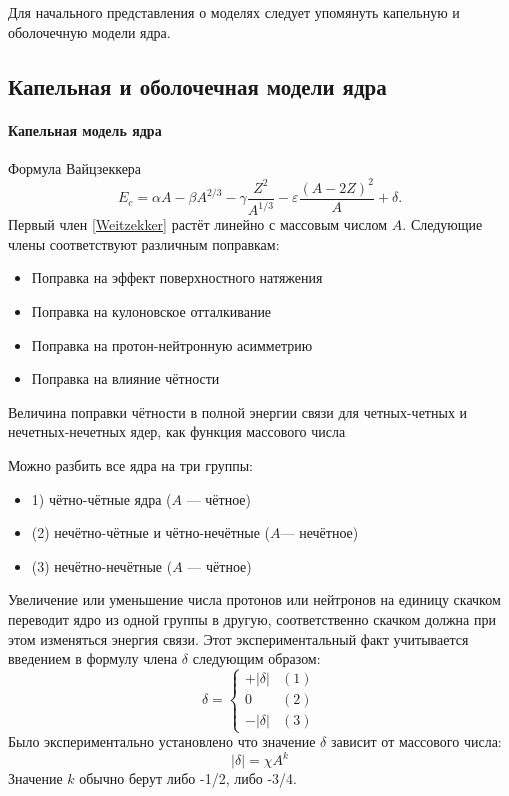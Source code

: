 \documentclass[a5paper,openany]{book}
\begin{document}
Для начального представления о моделях следует упомянуть капельную и оболочечную модели ядра.

\subsection{Капельная и оболочечная модели ядра}\label{s:NuclModels}


\paragraph{Капельная модель ядра}
Формула Вайцзеккера  \cite{Weizsacker}
\begin{equation}\label{Weitzekker}
 E_{c}=\alpha A-\beta A^{2/3}-\gamma {\frac {Z^{2}}{A^{1/3}}}-\varepsilon {\frac {(A-2Z)^{2}}{A}}+\delta.
\end{equation}
Первый член \eqref{Weitzekker} растёт линейно с массовым числом $A$. Следующие члены соответствуют различным поправкам:
\begin{itemize}
	\item Поправка на эффект поверхностного натяжения
	\item Поправка на кулоновское отталкивание
	\item Поправка на протон-нейтронную асимметрию
	\item Поправка на влияние чётности
\end{itemize}
Величина поправки чётности в полной энергии связи для четных-четных и нечетных-нечетных ядер, как функция массового числа

Можно разбить все ядра на три группы:
\begin{itemize}
	\item 1) чётно-чётные ядра ($A$ --- чётное)
	\item (2) нечётно-чётные и чётно-нечётные ($A$--- нечётное)
	\item (3) нечётно-нечётные ($A$ --- чётное)
\end{itemize}

Увеличение или уменьшение числа протонов или нейтронов на единицу скачком переводит ядро из одной группы в другую, соответственно скачком должна при этом изменяться энергия связи. Этот экспериментальный факт учитывается введением в формулу члена $\delta$ следующим образом:
\begin{equation}
 \delta =
 \begin{cases}+\left|\delta \right|&(1)\\0&(2)\\-\left|\delta \right|&(3)
\end{cases}
\end{equation}
Было экспериментально установлено что значение  $\delta$  зависит от массового числа:
\begin{equation}
\left|\delta \right|=\chi A^{k}
\end{equation}
Значение $k$
обычно берут либо -1/2, либо -3/4.
\end{document}
